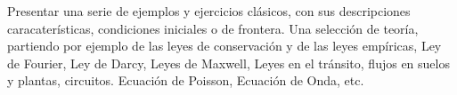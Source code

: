 Presentar una serie de ejemplos y ejercicios clásicos, con sus descripciones
caracaterísticas, condiciones iniciales o de frontera.  Una selección 
de teoría, partiendo por ejemplo de las leyes de conservación y de las 
leyes empíricas, Ley de Fourier, Ley de Darcy, Leyes de Maxwell, Leyes 
en el tránsito, flujos en suelos y plantas, circuitos.
Ecuación de Poisson, Ecuación de Onda, etc.